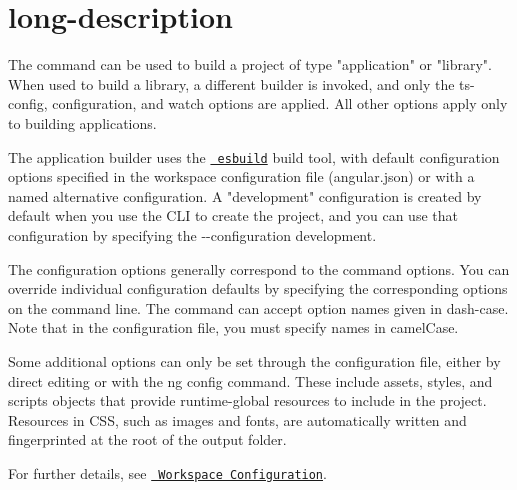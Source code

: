 \chapter{long-\/description}
\hypertarget{md__d_1_2_g_i_t_2_food_link_2foodlink_8client_2node__modules_2_0dangular_2cli_2src_2commands_2build_2long-description}{}\label{md__d_1_2_g_i_t_2_food_link_2foodlink_8client_2node__modules_2_0dangular_2cli_2src_2commands_2build_2long-description}
The command can be used to build a project of type "{}application"{} or "{}library"{}. When used to build a library, a different builder is invoked, and only the {\ttfamily ts-\/config}, {\ttfamily configuration}, and {\ttfamily watch} options are applied. All other options apply only to building applications.

The application builder uses the \href{https://esbuild.github.io/}{\texttt{ esbuild}} build tool, with default configuration options specified in the workspace configuration file ({\ttfamily angular.\+json}) or with a named alternative configuration. A "{}development"{} configuration is created by default when you use the CLI to create the project, and you can use that configuration by specifying the {\ttfamily -\/-\/configuration development}.

The configuration options generally correspond to the command options. You can override individual configuration defaults by specifying the corresponding options on the command line. The command can accept option names given in dash-\/case. Note that in the configuration file, you must specify names in camel\+Case.

Some additional options can only be set through the configuration file, either by direct editing or with the {\ttfamily ng config} command. These include {\ttfamily assets}, {\ttfamily styles}, and {\ttfamily scripts} objects that provide runtime-\/global resources to include in the project. Resources in CSS, such as images and fonts, are automatically written and fingerprinted at the root of the output folder.

For further details, see \href{guide/workspace-config}{\texttt{ Workspace Configuration}}. 